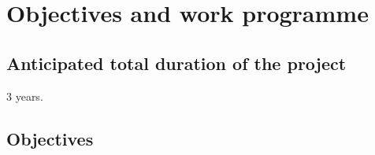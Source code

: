 \documentclass[10pt,fleqn,twoside]{article}
\begin{document}
% 
% 
% 
% 

\section{Objectives and work programme}
\renewcommand{\leftmark}{\sc Objectives and work programme}


\subsection{Anticipated total duration of the project}

3 years.

\subsection{Objectives}
\end{document}

